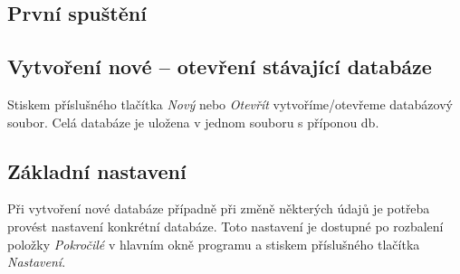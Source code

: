 \documentclass[12pt]{article}
\newcommand{\tl}[1]{\emph{#1}}
\begin{document}
\subsection{První spuštění}
\subsection{Vytvoření nové -- otevření stávající databáze}
Stiskem příslušného tlačítka \tl{Nový} nebo \tl{Otevřít} vytvoříme/otevřeme databázový soubor. Celá
databáze je uložena v jednom souboru s příponou db.
\subsection{Základní nastavení}
Při vytvoření nové databáze případně při změně některých údajů je potřeba provést nastavení
konkrétní databáze. Toto nastavení je dostupné po rozbalení položky \tl{Pokročilé} v hlavním okně
programu a stiskem příslušného tlačítka \tl{Nastavení}.
\end{document}
